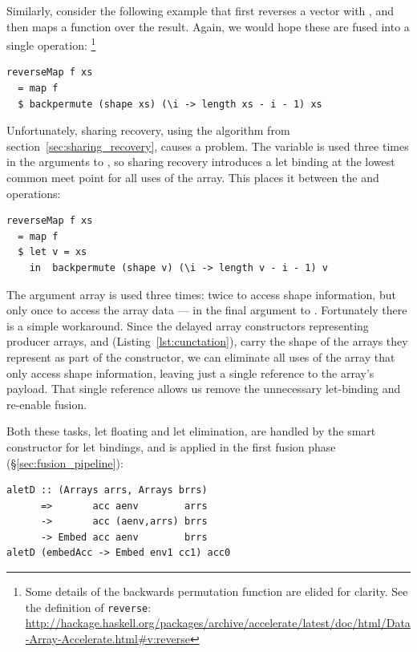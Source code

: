 Similarly, consider the following example that first reverses a vector with
, and then maps a function  over the result. Again, we
would hope these are fused into a single operation:%
\footnote{Some details of the backwards permutation function are elided for
clarity. See the definition of \texttt{reverse}:
\url{http://hackage.haskell.org/packages/archive/accelerate/latest/doc/html/Data-Array-Accelerate.html\#v:reverse}}
%
\begin{lstlisting}[style=haskell]
reverseMap f xs
  = map f
  $ backpermute (shape xs) (\i -> length xs - i - 1) xs
\end{lstlisting}
%
Unfortunately, sharing recovery, using the algorithm from
section~\ref{sec:sharing_recovery}, causes a problem. The variable 
is used three times in the arguments to , so sharing recovery
introduces a let binding at the lowest common meet point for all uses of the
array. This places it between the  and  operations:
%
\begin{lstlisting}[style=haskell]
reverseMap f xs
  = map f
  $ let v = xs
    in  backpermute (shape v) (\i -> length v - i - 1) v
\end{lstlisting}
%
The argument array is used three times: twice to access shape information, but
only once to access the array data --- in the final argument to
. Fortunately there is a simple workaround. Since the delayed
array constructors representing producer arrays,  and 
(Listing~\ref{lst:cunctation}), carry the shape of the arrays they represent as
part of the constructor, we can eliminate all uses of the array that only access
shape information, leaving just a single reference to the array's payload.
That single reference allows us remove the unnecessary let-binding and re-enable
fusion.

Both these tasks, let floating and let elimination, are handled by the smart
constructor for let bindings, and is applied in the first fusion phase
(\S\ref{sec:fusion_pipeline}):
%
\begin{lstlisting}[style=haskell
    ,name=aletD
    ,label=lst:aletD
    ,caption={[Fusion rule for let bindings]}]
aletD :: (Arrays arrs, Arrays brrs)
      =>       acc aenv        arrs
      ->       acc (aenv,arrs) brrs
      -> Embed acc aenv        brrs
aletD (embedAcc -> Embed env1 cc1) acc0
\end{lstlisting}

